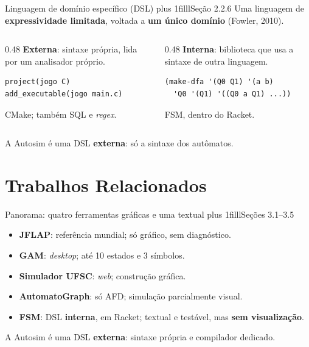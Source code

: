 \documentclass[aspectratio=169,12pt]{beamer}
\newcommand{\notexto}[1]{\hskip 0pt plus 1filll{\normalfont\small\color{white!85!acento}#1}}
\begin{document}
\begin{frame}[fragile,t]{Linguagem de domínio específico (DSL)\notexto{Seção 2.2.6}}
  Uma linguagem de \textbf{expressividade limitada}, voltada a \textbf{um único domínio}
  (Fowler, 2010).
  \vspace{4pt}
  \begin{columns}[T]
    \begin{column}{0.48\textwidth}
      \textbf{Externa}: sintaxe própria, lida por um analisador próprio.
\begin{lstlisting}[basicstyle=\ttfamily\normalsize]
project(jogo C)
add_executable(jogo main.c)
\end{lstlisting}
      CMake; também SQL e \textit{regex}.
    \end{column}
    \begin{column}{0.48\textwidth}
      \textbf{Interna}: biblioteca que usa a sintaxe de outra linguagem.
\begin{lstlisting}[basicstyle=\ttfamily\normalsize]
(make-dfa '(Q0 Q1) '(a b)
  'Q0 '(Q1) '((Q0 a Q1) ...))
\end{lstlisting}
      FSM, dentro do Racket.
    \end{column}
  \end{columns}
  \vspace{46pt}
  {\centering A Autosim é uma DSL \textbf{externa}: só a sintaxe dos autômatos.\par}
\end{frame}

\section{Trabalhos Relacionados}

\begin{frame}{Panorama: quatro ferramentas gráficas e uma textual\notexto{Seções 3.1--3.5}}
  \begin{itemize}
    \item \textbf{JFLAP}: referência mundial; só gráfico, sem diagnóstico.
    \item \textbf{GAM}: \textit{desktop}; até 10 estados e 3 símbolos.
    \item \textbf{Simulador UFSC}: \textit{web}; construção gráfica.
    \item \textbf{AutomatoGraph}: só AFD; simulação parcialmente visual.
    \item \textbf{FSM}: DSL \textbf{interna}, em Racket; textual e testável, mas
          \textbf{sem visualização}.
  \end{itemize}
  \vspace{6pt}
  A Autosim é uma DSL \textbf{externa}: sintaxe própria e compilador dedicado.
\end{frame}
\end{document}
